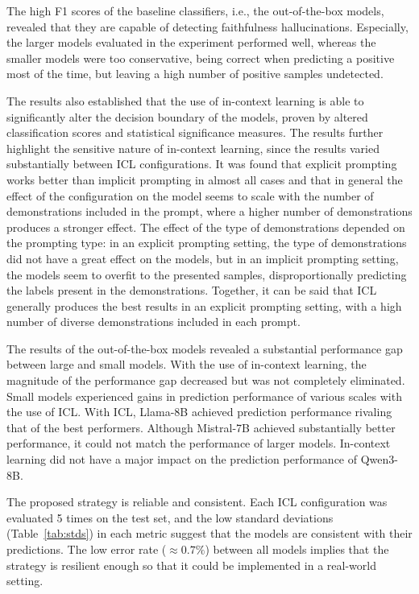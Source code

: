 \documentclass[english, 12pt, a4paper, sci, utf8, a-2b, online]{latex/definitions/aaltothesis}
\begin{document}
The high F1 scores of the baseline classifiers, i.e., the out-of-the-box models, revealed that they are capable of detecting faithfulness hallucinations. Especially, the larger models evaluated in the experiment performed well, whereas the smaller models were too conservative, being correct when predicting a positive most of the time, but leaving a high number of positive samples undetected.

The results also established that the use of in-context learning is able to significantly alter the decision boundary of the models, proven by altered classification scores and statistical significance measures. The results further highlight the sensitive nature of in-context learning, since the results varied substantially between ICL configurations. It was found that explicit prompting works better than implicit prompting in almost all cases and that in general the effect of the configuration on the model seems to scale with the number of demonstrations included in the prompt, where a higher number of demonstrations produces a stronger effect. The effect of the type of demonstrations depended on the prompting type: in an explicit prompting setting, the type of demonstrations did not have a great effect on the models, but in an implicit prompting setting, the models seem to overfit to the presented samples, disproportionally predicting the labels present in the demonstrations. Together, it can be said that ICL generally produces the best results in an explicit prompting setting, with a high number of diverse demonstrations included in each prompt.

The results of the out-of-the-box models revealed a substantial performance gap between large and small models. With the use of in-context learning, the magnitude of the performance gap decreased but was not completely eliminated. Small models experienced gains in prediction performance of various scales with the use of ICL. With ICL, Llama-8B achieved prediction performance rivaling that of the best performers. Although Mistral-7B achieved substantially better performance, it could not match the performance of larger models. In-context learning did not have a major impact on the prediction performance of Qwen3-8B.

The proposed strategy is reliable and consistent. Each ICL configuration was evaluated 5 times on the test set, and the low standard deviations (Table~\ref{tab:stds}) in each metric suggest that the models are consistent with their predictions. The low error rate ($\approx 0.7\%$) between all models implies that the strategy is resilient enough so that it could be implemented in a real-world setting.
\end{document}

